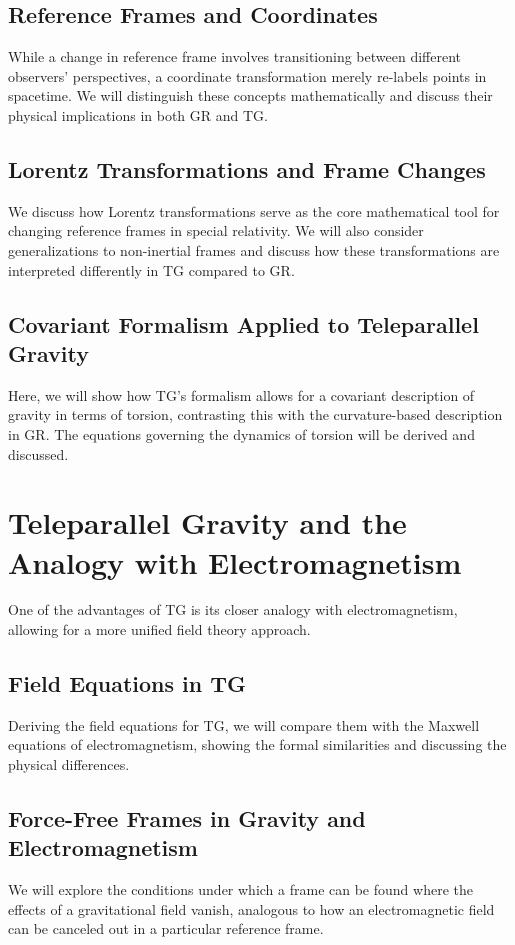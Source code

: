 \documentclass[12pt]{article}
\begin{document}
\subsection{Reference Frames and Coordinates}
While a change in reference frame involves transitioning between different observers' perspectives, a coordinate transformation merely re-labels points in spacetime. We will distinguish these concepts mathematically and discuss their physical implications in both GR and TG.

\subsection{Lorentz Transformations and Frame Changes}
We discuss how Lorentz transformations serve as the core mathematical tool for changing reference frames in special relativity. We will also consider generalizations to non-inertial frames and discuss how these transformations are interpreted differently in TG compared to GR.

\subsection{Covariant Formalism Applied to Teleparallel Gravity}
Here, we will show how TG's formalism allows for a covariant description of gravity in terms of torsion, contrasting this with the curvature-based description in GR. The equations governing the dynamics of torsion will be derived and discussed.

\section{Teleparallel Gravity and the Analogy with Electromagnetism}
One of the advantages of TG is its closer analogy with electromagnetism, allowing for a more unified field theory approach.

\subsection{Field Equations in TG}
Deriving the field equations for TG, we will compare them with the Maxwell equations of electromagnetism, showing the formal similarities and discussing the physical differences.

\subsection{Force-Free Frames in Gravity and Electromagnetism}
We will explore the conditions under which a frame can be found where the effects of a gravitational field vanish, analogous to how an electromagnetic field can be canceled out in a particular reference frame.
\end{document}
